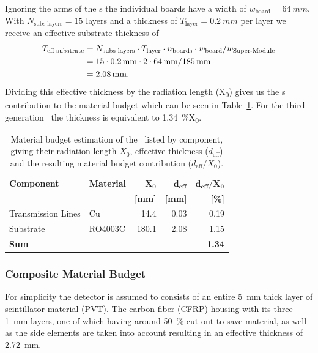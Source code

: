 \documentclass[../BTOF_summary.tex]{subfiles}
\begin{document}
Ignoring the arms of the \railboard s the individual boards have a width of $w_\text{board} = \SI{64}{mm}$.
With $N_\text{subs layers} = 15$ layers and a thickness of $T_\text{layer} = \SI{0.2}{mm}$ per layer we receive an effective substrate thickness of
\begin{align}
	T_\text{eff substrate} &= N_\text{subs layers} \cdot T_\text{layer} \cdot n_\text{boards} \cdot w_\text{board} / w_\text{Super-Module} \\
	&= 15 \cdot \SI{0.2}{mm} \cdot 2 \cdot \SI{64}{mm} / \SI{185}{mm} \\
	&= \SI{2.08}{mm} . 
\end{align}
Dividing this effective thickness by the radiation length (X\textsubscript{0}) gives us the \railboard s contribution to the material budget which can be seen in Table~\ref{tab:MaterialBudget_Railboard}.
For the third generation \railboard\ the thickness is equivalent to \SI{1.34}{\percent}X\textsubscript{0}.

\begin{table}[htbp]
\centering
\caption[Material budget estimation of the \railboard .]{Material budget estimation of the \railboard\ listed by component, giving their radiation length $X_0$, effective thickness ($d_\text{eff}$) and the resulting material budget contribution ($d_{\text{eff}} / X_0$).}
\label{tab:MaterialBudget_Railboard}
\begin{tabular}{@{}llrrr@{}}
\toprule
\textbf{Component} & \textbf{Material} & $\mathbf{X_0}$ & $\mathbf{d_{eff}}$ & $\mathbf{d_{eff}/X_{0}}$ \\
                   & \textbf{}         & \textbf{[mm]}  & \textbf{[mm]}      & \textbf{[\%]}            \\ \midrule
Transmission Lines & Cu      & 14.4   & 0.03  & 0.19      \\
Substrate          & RO4003C & 180.1  & 2.08  & 1.15      \\ \midrule
\textbf{Sum}       &				      &                &                    & \textbf{1.34}            \\ \bottomrule
\end{tabular}
\end{table}


\subsubsection*{Composite Material Budget}
For simplicity the detector is assumed to consists of an entire \SI{5}{mm} thick layer of scintillator material (PVT).
The carbon fiber (CFRP) housing with its three \SI{1}{mm} layers, one of which having around \SI{50}{\percent} cut out to save material, as well as the side elements are taken into account resulting in an effective thickness of \SI{2.72}{mm}.
\end{document}
